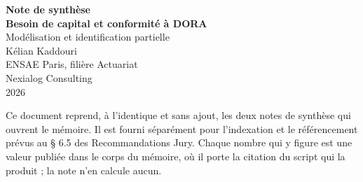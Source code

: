 \documentclass[12pt,a4paper]{report}
\begin{document}
\thispagestyle{empty}
\begin{center}
  {\large\bfseries Note de synthèse}\\[14pt]
  {\Large\bfseries Besoin de capital et conformité à DORA}\\[6pt]
  {\large Modélisation et identification partielle}\\[22pt]
  {\large Kélian Kaddouri}\\[5pt]
  ENSAE Paris, filière Actuariat\\[3pt]
  Nexialog Consulting\\[3pt]
  2026
\end{center}

\vspace{16pt}
\noindent\hrulefill

\vspace{10pt}
\noindent\small Ce document reprend, à l'identique et sans ajout, les deux notes
de synthèse qui ouvrent le mémoire. Il est fourni séparément pour l'indexation et
le référencement prévus au § 6.5 des Recommandations Jury. Chaque nombre qui y
figure est une valeur publiée dans le corps du mémoire, où il porte la citation du
script qui la produit ; la note n'en calcule aucun.\normalsize

\clearpage


\end{document}
